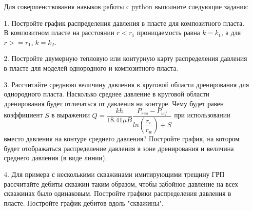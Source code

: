 Для совершенствования навыков работы с python выполните следующие задания:

1. Постройте график распределения давления в пласте для композитного пласта. В композитном пласте на расстоянии $r<r_1$ проницаемость равна $k=k_1$, а для $r>=r_1$, $k=k_2$. 

2. Постройте двумерную тепловую или контурную карту распределения давления в пласте для моделей однородного и композитного пласта.

3. Рассчитайте среднюю величину давления в круговой области дренирования для однородного пласта. Насколько среднее давление в круговой области дренирования будет отличаться от давления на контуре. Чему будет равен коэффициент $S$ в выражении  $Q=\dfrac{kh}{18.41\mu B} \dfrac{P_{res}-P_{wf}}{ln(\dfrac{r_e}{r_w})+S}$ при использовании вместо давления на контуре среднего давления? Постройте график, на котором будет отображаться распределение давления в зоне дренирования и величина среднего давления (в виде линии).

4. Для примера с несколькими скважинами имитирующими трещину ГРП рассчитайте дебиты скважин таким образом, чтобы забойное давление на всех скважинах было одинаковым. Постройте графики распределения давления в пласте. Постройте график дебитов вдоль "скважины".

